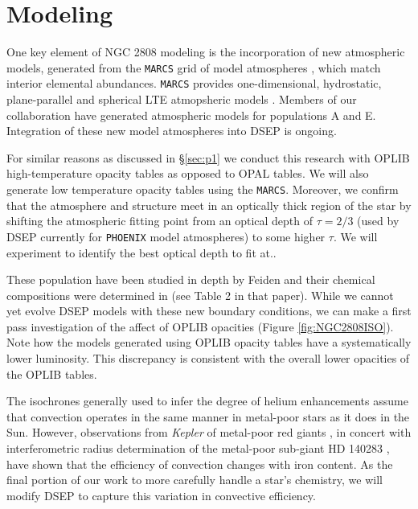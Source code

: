 \section{Modeling}\label{sec:modeling}
One key element of NGC 2808 modeling is the incorporation of new atmospheric
models, generated from the \texttt{MARCS} grid of model atmospheres \citep{Plez2008},
which match interior elemental abundances. \texttt{MARCS} provides one-dimensional,
hydrostatic, plane-parallel and spherical LTE atmopsheric models
\citep{Gustafsson2008}. Members of our collaboration have generated atmospheric 
models for populations A and E.  Integration of these new model atmospheres
into DSEP is ongoing. 

For similar reasons as discussed in \S\ref{sec:p1} we conduct this research
with OPLIB high-temperature opacity tables as opposed to OPAL tables. We will
also generate low temperature opacity tables using the \texttt{MARCS}.
Moreover, we confirm that the atmosphere and structure meet in an optically
thick region of the star by shifting the atmospheric fitting point from an optical
depth of $\tau = 2/3$ (used by DSEP currently for \texttt{PHOENIX} model atmospheres) to
some higher $\tau$. We will experiment to identify the best optical depth to
fit at.. 

These population have been studied in depth by Feiden and their chemical
compositions were determined in \citet{Milone2015} (see Table 2 in that paper).
While we cannot yet evolve DSEP models with these new boundary conditions, we
can make a first pass investigation of the affect of OPLIB opacities (Figure
\ref{fig:NGC2808ISO}). Note how the models generated using OPLIB opacity tables
have a systematically lower luminosity. This discrepancy is consistent with
the overall lower opacities of the OPLIB tables. 


The isochrones generally used to infer the degree of helium enhancements assume that
convection operates in the same manner in metal-poor stars as it does in the
Sun. However, observations from \textit{Kepler} of metal-poor red giants
\citep{Bonaca2012, tayar2017correlation}, in concert with interferometric
radius determination of the metal-poor sub-giant HD 140283
\citep{creevey2015benchmark}, have shown that the efficiency of convection
changes with iron content. As the final portion of our work to more carefully
handle a star's chemistry, we will modify DSEP to capture this variation in
convective efficiency. 
